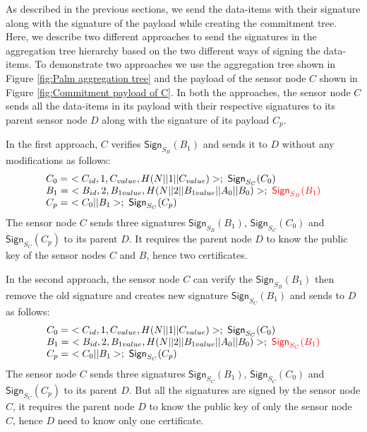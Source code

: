 	As described in the previous sections, we send the data-items with their signature along with the signature of the payload while creating the commitment tree.
	Here, we describe two different approaches to send the signatures in the aggregation tree hierarchy based on the two different ways of signing the data-items.
	To demonstrate two approaches we use the aggregation tree shown in Figure \ref{fig:Palm aggregation tree} and the payload of the sensor node $C$ shown in Figure \ref{fig:Commitment payload of C}.
	In both the approaches, the sensor node $C$ sends all the data-items in its payload with their respective signatures to its parent sensor node $D$ along with the signature of its payload $C_{p}$.

	In the first approach, $C$ verifies $\textsf{Sign}_{S_{B}}(B_{1})$ and sends it to $D$ without any modifications as follows:
	\begin{equation}	
		\begin{array}{l}
			C_{0} =\ <C_{id}, 1, C_{value}, H(N||1||C_{value})>;\ \textsf{Sign}_{S_{C}}(C_{0})\\
			B_{1} =\ <B_{id}, 2, B_{1value}, H(N||2||B_{1value}||A_{0}||B_{0})>;\  \textcolor{red}{\textsf{Sign}_{S_{B}}(B_{1})}\\
			C_{p} =\ <C_{0}||B_{1}>;\ \textsf{Sign}_{S_{C}}(C_{p})
		\end{array}
		\label{eq:forwarding-payload-without-resigning}
	\end{equation}
	The sensor node $C$ sends three signatures $\textsf{Sign}_{S_{B}}(B_{1})$, $\textsf{Sign}_{S_{C}}(C_{0}) $ and $\textsf{Sign}_{S_{C}}(C_{p})$ to its parent $D$.
	It requires the parent node $D$ to know the public key of the sensor nodes $C$ and $B$, hence two certificates.

	In the second approach, the sensor node $C$ can verify the $\textsf{Sign}_{S_{B}}(B_{1})$ then remove the old signature and creates new signature $\textsf{Sign}_{S_{C}}(B_{1})$ and sends to $D$ as follows:
	\begin{equation}	
		\begin{array}{l}
			C_{0} =\ <C_{id}, 1, C_{value}, H(N||1||C_{value})>;\ \textsf{Sign}_{S_{C}}(C_{0})\\
			B_{1} =\ <B_{id}, 2, B_{1value}, H(N||2||B_{1value}||A_{0}||B_{0})>;\  \textcolor{red}{\textsf{Sign}_{S_{C}}(B_{1})}\\
			C_{p} =\ <C_{0}||B_{1}>;\ \textsf{Sign}_{S_{C}}(C_{p})
		\end{array}
		\label{eq:forwarding-payload-with-resigning}
	\end{equation}
	The sensor node $C$ sends three signatures $\textsf{Sign}_{S_{C}}(B_{1})$, $\textsf{Sign}_{S_{C}}(C_{0}) $ and $\textsf{Sign}_{S_{C}}(C_{p})$ to its parent $D$.
	But all the signatures are signed by the sensor node $C$, it requires the parent node $D$ to know the public key of only the sensor node $C$, hence $D$ need to know only one certificate.

